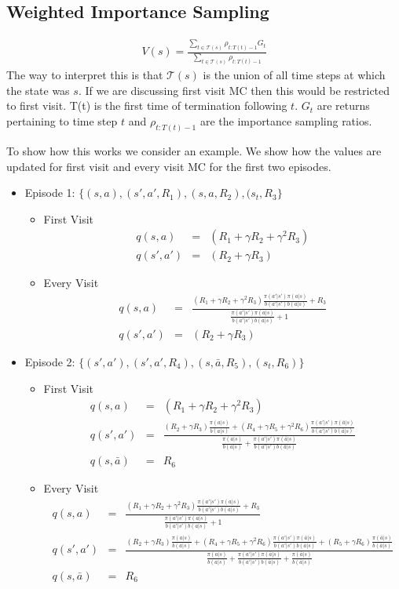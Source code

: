 \documentclass[11pt,a4paper]{article}
\newcommand\bea{\begin{eqnarray}}
\newcommand\eea{\end{eqnarray}}
\begin{document}
\subsection{Weighted Importance Sampling}

\bea
V(s) = \frac{\sum_{t \in \mathcal T(s)} \rho_{t:T(t)-1} G_t}{\sum_{t \in \mathcal T(s)} \rho_{t:T(t)-1} }
\eea
The way to interpret this is that $\mathcal T(s)$ is the union of all time steps at which the state was $s$.  If we are discussing first visit MC then this would be restricted to first visit. T(t) is the first time of termination following $t$. $G_t$ are returns pertaining to time step $t$ and $ \rho_{t:T(t)-1}$ are the importance sampling ratios.

To show how this works we consider an example. We show how the values are updated for first visit and every visit MC for the first two episodes. 
\begin{itemize}
\item Episode 1: $\{(s,a),(s',a',R_1),(s,a,R_2),(s_t,R_3\}$ 
\begin{itemize}
\item First Visit
\bea
q(s,a) &=& (R_1 + \gamma R_2+\gamma^2 R_3) \\
q(s',a') &=& (R_2 + \gamma R_3)
\eea
\item Every Visit
\bea
q(s,a) &=& \frac{(R_1 + \gamma R_2+\gamma^2 R_3) \frac{\pi(a'|s') \pi(a|s)}{b(a'|s') b(a|s)}+R_3}{\frac{\pi(a'|s') \pi(a|s)}{b(a'|s') b(a|s)}+1} \\
q(s',a') &=& (R_2 + \gamma R_3) 
\eea
\end{itemize}
\item  Episode 2: $\{(s',a'),(s',a',R_4),(s,\bar a,R_5),(s_t,R_6)\}$
\begin{itemize}
\item First Visit
\bea
q(s,a) &=& (R_1 + \gamma R_2+\gamma^2 R_3)  \\
q(s',a') &=& \frac{(R_2 + \gamma R_3) \frac{\pi(a|s)}{b(a|s)} + (R_4 + \gamma R_5 + \gamma^2 R_6) \frac{\pi(a'|s') \pi(\bar a|s)}{b(a'|s') b(\bar a|s)}}{ \frac{\pi(a|s)}{b(a|s)} + \frac{\pi(a'|s') \pi(\bar a|s)}{b(a'|s') b(\bar a|s)}} \\
q(s,\bar a) &=& R_6
\eea
\item Every Visit
\bea
q(s,a) &=& \frac{(R_1 + \gamma R_2+\gamma^2 R_3) \frac{\pi(a'|s') \pi(a|s)}{b(a'|s') b(a|s)}+R_3}{\frac{\pi(a'|s') \pi(a|s)}{b(a'|s') b(a|s)}+1} \\
q(s',a') &=& \frac{(R_2 + \gamma R_3) \frac{\pi(a|s)}{b(a|s)} + (R_4 + \gamma R_5 + \gamma^2 R_6) \frac{\pi(a'|s') \pi(\bar a|s)}{b(a'|s') b(\bar a|s)} + (R_5+ \gamma R_6)  \frac{ \pi(\bar a|s)}{ b(\bar a|s)}}{\frac{\pi(a|s)}{b(a|s)} + \frac{\pi(a'|s') \pi(\bar a|s)}{b(a'|s') b(\bar a|s)} +\frac{ \pi(\bar a|s)}{ b(\bar a|s)}} \\
q(s,\bar a) &=& R_6
\eea
\end{itemize}
\end{itemize}
\end{document}
